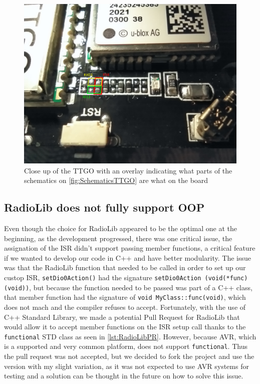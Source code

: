 \begin{figure}[h!]
        \centering
        \includegraphics[width=15cm]{Figures/DebuggerSolution.jpeg}
        \caption{Close up of the TTGO with an overlay indicating what parts of the schematics on \autoref{fig:SchematicsTTGO} are what on the board}
        \label{fig:DebuggerSolutiion}
\end{figure}

\subsection{RadioLib does not fully support OOP}
Even though the choice for RadioLib appeared to be the optimal one at the beginning, as the development progressed, there was one critical issue, the assignation of the ISR didn't support passing member functions, a critical feature if we wanted to develop our code in C++ and have better modularity. The issue was that the RadioLib function that needed to be called in order to set up our custop ISR, \texttt{setDio0Action()} had the signature \texttt{setDio0Action (void(*func)(void))}, but because the function needed to be passed was part of a C++ class, that member function had the signature of \texttt{void MyClass::func(void)}, which does not mach and the compiler refuses to accept. Fortunately, with the use of C++ Standard Library, we made a potential Pull Request for RadioLib that would allow it to accept member functions on the ISR setup call thanks to the \texttt{functional} STD class as seen in \autoref{lst:RadioLibPR}. However, because AVR, which is a supported and very common platform, does not support \texttt{functional}\cite{RadioLibPR}. Thus the pull request was not accepted, but we decided to fork the project and use the version with my slight variation, as it was not expected to use AVR systems for testing and a solution can be thought in the future on how to solve this issue.

